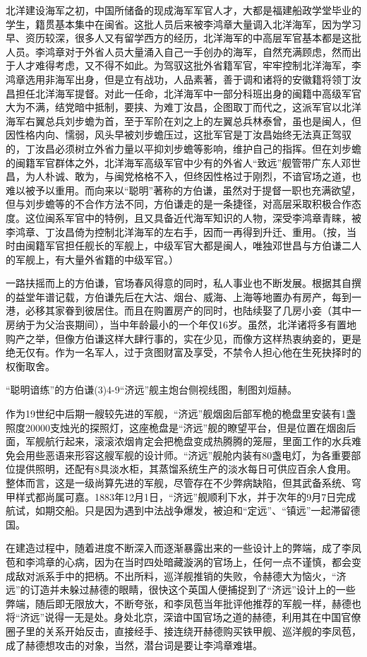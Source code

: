 \documentclass[12pt,UTF8]{ctexbook}
\begin{document}
北洋建设海军之初，中国所储备的现成海军军官人才，大都是福建船政学堂毕业的学生，籍贯基本集中在闽省。这批人员后来被李鸿章大量调入北洋海军，因为学习早、资历较深，很多人又有留学西方的经历，北洋海军的中高层军官基本都是这批人员。李鸿章对于外省人员大量涌入自己一手创办的海军，自然充满顾虑，然而出于人才难得考虑，又不得不如此。为驾驭这批外省籍军官，牢牢控制北洋海军，李鸿章选用非海军出身，但是立有战功，人品素著，善于调和诸将的安徽籍将领丁汝昌担任北洋海军提督。对此一任命，北洋海军中一部分科班出身的闽籍中高级军官大为不满，结党暗中抵制，要挟、为难丁汝昌，企图取丁而代之，这派军官以北洋海军右翼总兵刘步蟾为首，至于军阶在刘之上的左翼总兵林泰曾，虽也是闽人，但因性格内向、懦弱，风头早被刘步蟾压过，这批军官是丁汝昌始终无法真正驾驭的，丁汝昌必须树立外省力量以平抑刘步蟾等影响，维护自己的指挥。但在刘步蟾的闽籍军官群体之外，北洋海军高级军官中少有的外省人“致远”舰管带广东人邓世昌，为人朴诚、敢为，与闽党格格不入，但终因性格过于刚烈，不谙官场之道，也难以被予以重用。而向来以“聪明”著称的方伯谦，虽然对于提督一职也充满欲望，但与刘步蟾等的不合作方法不同，方伯谦走的是一条捷径，对高层采取积极合作态度。这位闽系军官中的特例，且又具备近代海军知识的人物，深受李鸿章青睐，被李鸿章、丁汝昌倚为控制北洋海军的左右手，因而一再得到升迁、重用。（按，当时由闽籍军官担任舰长的军舰上，中级军官大都是闽人，唯独邓世昌与方伯谦二人的军舰上，有大量外省籍的中级军官。）

一路扶摇而上的方伯谦，官场春风得意的同时，私人事业也不断发展。根据其自撰的益堂年谱记载，方伯谦先后在大沽、烟台、威海、上海等地置办有房产，每到一港，必移其家眷到彼居住。而且在购置房产的同时，也陆续娶了几房小妾（其中一房纳于为父治丧期间），当中年龄最小的一个年仅16岁。虽然，北洋诸将多有置地购产之举，但像方伯谦这样大肆行事的，实在少见，而像方这样热衷纳妾的，更是绝无仅有。作为一名军人，过于贪图财富及享受，不禁令人担心他在生死抉择时的权衡取舍。

“聪明谙练”的方伯谦(3)4-9“济远”舰主炮台侧视线图，制图刘烜赫。

作为19世纪中后期一艘较先进的军舰，“济远”舰烟囱后部军桅的桅盘里安装有1盏照度20000支烛光的探照灯，这座桅盘是“济远”舰的瞭望平台，但是位置在烟囱后面，军舰航行起来，滚滚浓烟肯定会把桅盘变成热腾腾的笼屉，里面工作的水兵难免会用些恶语来形容这艘军舰的设计师。“济远”舰舱内装有80盏电灯，为各重要部位提供照明，还配有8具淡水柜，其蒸馏系统生产的淡水每日可供应百余人食用。整体而言，这是一级尚算先进的军舰，尽管存在不少弊病缺陷，但其武备系统、穹甲样式都尚属可嘉。1883年12月1日，“济远”舰顺利下水，并于次年的9月7日完成航试，如期交船。只是因为遇到中法战争爆发，被迫和“定远”、“镇远”一起滞留德国。

在建造过程中，随着进度不断深入而逐渐暴露出来的一些设计上的弊端，成了李凤苞和李鸿章的心病，因为在当时四处暗藏漩涡的官场上，任何一点不谨慎，都会变成敌对派系手中的把柄。不出所料，巡洋舰推销的失败，令赫德大为恼火，“济远”的订造并未躲过赫德的眼睛，很快这个英国人便捕捉到了“济远”设计上的一些弊端，随后即无限放大，不断夸张，和李凤苞当年批评他推荐的军舰一样，赫德也将“济远”说得一无是处。身处北京，深谙中国官场之道的赫德，利用其在中国官僚圈子里的关系开始反击，直接经手、接连绕开赫德购买铁甲舰、巡洋舰的李凤苞，成了赫德想攻击的对象，当然，潜台词是要让李鸿章难堪。
\end{document}
